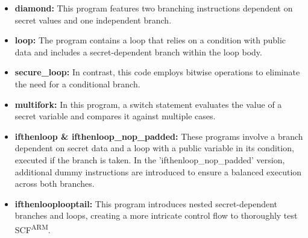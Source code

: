 \begin{itemize}
    \item \textbf{diamond:} This program features two branching instructions dependent on secret values and one independent branch.

    \item \textbf{loop:} The program contains a loop that relies on a condition with public data and includes a secret-dependent branch within the loop body. 
    
    \item \textbf{secure\_loop:} In contrast, this code employs bitwise operations to eliminate the need for a conditional branch.
    
    \item \textbf{multifork:} In this program, a switch statement evaluates the value of a secret variable and compares it against multiple cases. 
    
    \item \textbf{ifthenloop \& ifthenloop\_nop\_padded:} These programs involve a branch dependent on secret data and a loop with a public variable in its condition, executed if the branch is taken. In the 'ifthenloop\_nop\_padded' version, additional dummy instructions are introduced to ensure a balanced execution across both branches.  
    
    \item \textbf{ifthenlooplooptail:} This program introduces nested secret-dependent branches and loops, creating a more intricate control flow to thoroughly test \ac{SCF}\textsuperscript{ARM}.

\end{itemize}


